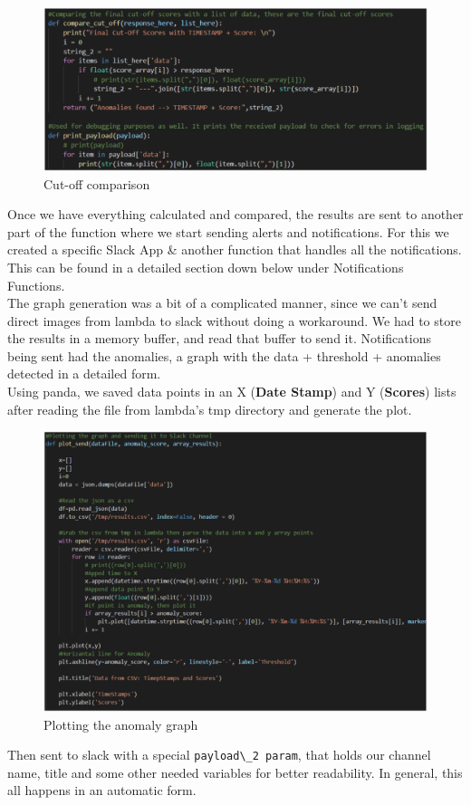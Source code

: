 \begin{figure}[ht]
    \centering
    \includegraphics[width=1\textwidth]{images/cutt-off-comparison.png}
    \caption{Cut-off comparison}
    \label{fig:cut_off_comparison}
\end{figure}
Once we have everything calculated and compared, the results are sent to another part of the function where we start sending alerts and notifications. For this we created a specific Slack App \& another function that handles all the notifications. This can be found in a detailed section down below under Notifications Functions.\\

The graph generation was a bit of a complicated manner, since we can’t send direct images from lambda to slack without doing a workaround. We had to store the results in a memory buffer, and read that buffer to send it. Notifications being sent had the anomalies, a graph with the data + threshold + anomalies detected in a detailed form.\\

Using panda, we saved data points in an X (\textbf{Date Stamp}) and Y (\textbf{Scores}) lists after reading the file from lambda’s tmp directory and generate the plot.
\begin{figure}[h]
    \centering
    \includegraphics[width=1\textwidth]{images/graph-plotting.png}
    \caption{Plotting the anomaly graph}
    \label{fig:graph_plotting}
\end{figure}
Then sent to slack with a special \verb|payload\_2 param|, that holds our channel name, title and some other needed variables for better readability. In general, this all happens in an automatic form.